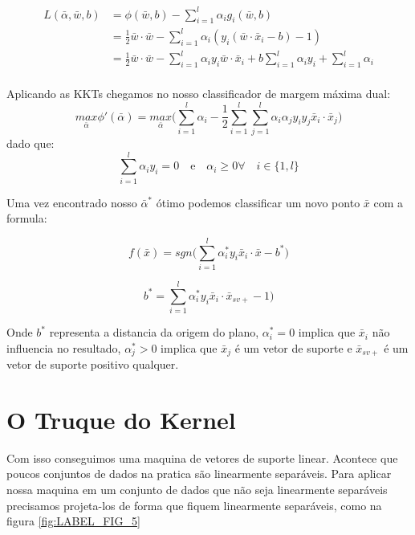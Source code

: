 \begin{equation}
\begin{split}
L(\bar{\alpha},\bar{w},b) &=\phi(\bar{w},b) -  \sum_{i=1}^{l}\alpha_i g_i (\bar{w},b) \\
 &=\frac{1}{2}\bar{w}\cdot\bar{w} - \sum_{i=1}^{l}\alpha_i (y_i(\bar{w}\cdot \bar{x}_i -b)-1) \\
 &=\frac{1}{2}\bar{w}\cdot\bar{w} - \sum_{i=1}^{l}\alpha_i y_i \bar{w}\cdot \bar{x}_i + b \sum_{i=1}^{l}\alpha_i y_i + \sum_{i=1}^{l}\alpha_i\\
\end{split}
\end{equation}

Aplicando as KKTs chegamos no nosso classificador de margem máxima dual:
\begin{equation}
    \underset{\bar{\alpha}}{max} \phi' (\bar{\alpha}) = \underset{\bar{\alpha}}{max} \Bigg( \sum_{i=1}^{l}\alpha_i - \frac{1}{2}\sum_{i=1}^{l}\sum_{j=1}^{l}\alpha_i \alpha_j y_i y_j \bar{x}_i\cdot \bar{x}_j \Bigg)
    \label{eq:EQ_Treinador_1}
\end{equation}
dado que:
\begin{equation}
    \sum_{i=1}^{l}\alpha_i y_i = 0 \quad \text{e} \quad \alpha_i \ge 0 \forall \quad i \in \{1,l\}
    \label{eq:restricoes}
\end{equation}

Uma vez encontrado nosso $\bar{\alpha}^*$ ótimo podemos classificar um novo ponto $\bar{x}$ com a formula:

\begin{equation}
    f(\bar{x}) = sgn\Bigg(
        \sum_{i=1}^{l} \alpha_i^*y_i\bar{x}_i\cdot\bar{x}
        -b^*
    \Bigg)
    \label{eq:EQ_Classificador_1}
\end{equation}

\begin{equation}
    b^* = \sum_{i=1}^{l} \alpha_i^*y_i\bar{x}_i\cdot\bar{x}_{sv+}
        -1
    \Bigg)
    \label{eq:EQ_B_1}
\end{equation}

Onde $b^*$ representa a distancia da origem do plano, $\alpha_i^*=0$ implica que $\bar{x}_i$ não influencia no resultado, $\alpha_j^*> 0$ implica que $\bar{x}_j$ é um vetor de suporte e $\bar{x}_{sv+}$ é um vetor de suporte positivo qualquer.


\section{O Truque do Kernel}
Com isso conseguimos uma maquina de vetores de suporte linear. Acontece que poucos conjuntos de dados na pratica são linearmente separáveis. Para aplicar nossa maquina em um conjunto de dados que não seja linearmente separáveis precisamos projeta-los de forma que fiquem linearmente separáveis, como na figura \ref{fig:LABEL_FIG_5}


